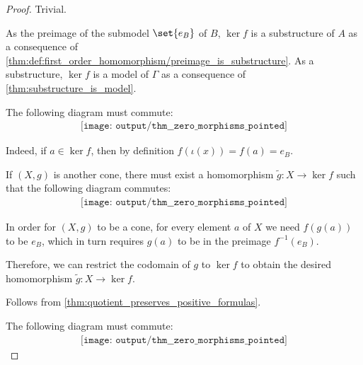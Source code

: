\begin{proof}
   Trivial.


   As the preimage of the submodel \( \set{ e_B } \) of \( B \), \( \ker f \) is a substructure of \( A \) as a consequence of \cref{thm:def:first_order_homomorphism/preimage_is_substructure}. As a substructure, \( \ker f \) is a model of \( \Gamma \) as a consequence of \cref{thm:substructure_is_model}.

   The following diagram must commute:
  \begin{equation*}
    \begin{aligned}
      \texttt{[image: output/thm\_\_zero\_morphisms\_pointed]}
    \end{aligned}
  \end{equation*}

  Indeed, if \( a \in \ker f \), then by definition \( f(\iota(x)) = f(a) = e_B \).

   If \( (X, g) \) is another cone, there must exist a homomorphism \( \widetilde g: X \to \ker f \) such that the following diagram commutes:
  \begin{equation*}
    \begin{aligned}
      \texttt{[image: output/thm\_\_zero\_morphisms\_pointed]}
    \end{aligned}
  \end{equation*}

  In order for \( (X, g) \) to be a cone, for every element \( a \) of \( X \) we need \( f(g(a)) \) to be \( e_B \), which in turn requires \( g(a) \) to be in the preimage \( f^{-1}(e_B) \).

  Therefore, we can restrict the codomain of \( g \) to \( \ker f \) to obtain the desired homomorphism \( \widetilde g: X \to \ker f \).


   Follows from \cref{thm:quotient_preserves_positive_formulas}.

   The following diagram must commute:
  \begin{equation*}
    \begin{aligned}
      \texttt{[image: output/thm\_\_zero\_morphisms\_pointed]}
    \end{aligned}
  \end{equation*}


\end{proof}
